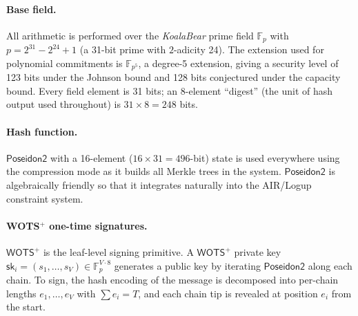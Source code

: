 \documentclass[11pt,a4paper]{article}
\newcommand{\F}{\mathbb{F}}
\newcommand{\KB}{\mathbb{F}_{p}}  %
\newcommand{\WOTS}{\textsf{WOTS}^{+}\xspace}
\newcommand{\poseidon}{\textsf{Poseidon2}\xspace}
\begin{document}
\paragraph{Base field.}
All arithmetic is performed over the \emph{KoalaBear} prime field $\F_{p}$ with $p = 2^{31} - 2^{24} + 1$ (a 31-bit prime with $2$-adicity 24). The extension used for polynomial commitments is $\F_{p^5}$, a degree-5 extension, giving a security level of 123 bits under the Johnson bound and 128 bits conjectured under the capacity bound. Every field element is 31 bits; an 8-element ``digest'' (the unit of hash output used throughout) is $31 \times 8 = 248$ bits.

\paragraph{Hash function.}
$\poseidon$ with a 16-element ($16 \times 31 = 496$-bit) state is used everywhere using the compression mode as it builds all Merkle trees in the system.  $\poseidon$ is algebraically friendly so that it integrates naturally into the AIR/Logup constraint system.

\paragraph{WOTS$^+$ one-time signatures.}
$\WOTS$ is the leaf-level signing primitive.
A $\WOTS$ private key $\mathsf{sk}_i = (s_1, \ldots, s_V) \in \KB^{V \cdot 8}$ generates a public key by iterating $\poseidon$ along each chain.  To sign, the hash encoding of the message is decomposed into per-chain lengths $e_1, \ldots, e_V$ with $\sum e_i = T$, and each chain tip is revealed at position $e_i$ from the start.
\end{document}

